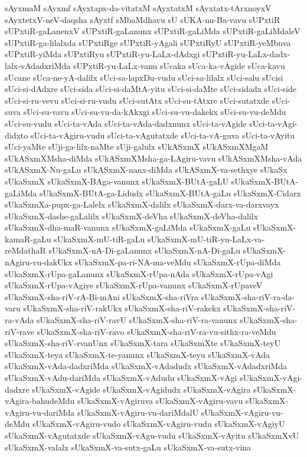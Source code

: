 {sAyxmaM
sAyxmf
sAyxtapx-da-vitatxM
sAyxtatxM
sAyxtatx-tArxnoyxV
sAyxtetxV-neV-daqsha
sAyxtf
sMbaMdhavu
sU
sUKA-nu-Ba-vavu
sUPxtiR
sUPxtiR-gaLanenxV
sUPxtiR-gaLanunx
sUPxtiR-gaLiMda
sUPxtiR-gaLiMdaleV
sUPxtiR-ga-lilalxda
sUPxtiRge
sUPxtiR-yAgali
sUPxtiRyU
sUPxtiR-yeMbuva
sUPxtiR-yiMda
sUPxtiRyu
sUPxtiR-yu-LaLx-dAdxgi
sUPxtiR-yu-LaLx-dadx-lalx-vAdadxriMda
sUPxtiR-yu-LaLx-vanu
sUcaka
sUca-ka-vAgide
sUca-kavu
sUcane
sUca-ne-yA-dalilx
sUci-sa-lapxDu-vudu
sUci-sa-lilalx
sUci-salu
sUcisi
sUci-si-dAdxre
sUci-sida
sUci-si-daMtA-yitu
sUci-si-daMte
sUci-sidadx
sUci-side
sUci-si-ru-vevu
sUci-si-ru-vudu
sUci-sutAtx
sUci-su-tAtxre
sUci-sutatxde
sUci-suva
sUci-su-vavu
sUci-su-vu-da-kAkxgi
sUci-su-vu-dakekx
sUci-su-vu-deMdu
sUci-su-vudu
sUci-ta-vAda
sUci-ta-vAda-dadxnunx
sUci-ta-vAgide
sUci-ta-vAgi-didxto
sUci-ta-vAgiru-vudu
sUci-ta-vAgutatxde
sUci-ta-vA-guva
sUci-ta-vAyitu
sUci-yaMte
sUji-ga-lilx-naMte
sUji-galulx
sUkASxmX
sUkASxmXMgaM
sUkASxmXMsha-diMda
sUkASxmXMsha-ga-LAgiru-vavu
sUkASxmXMsha-vAda
sUkASxmX-Nu-gaLu
sUkASxmX-nanx-diMda
sUkASxmX-va-sethxye
sUkaSx
sUkaSxmX
sUkaSxmX-BAga-vanunx
sUkaSxmX-BUtA-gaLU
sUkaSxmX-BUtA-gaLiMda
sUkaSxmX-BUtA-ga-Lidudx
sUkaSxmX-BUtA-gaLu
sUkaSxmX-Cidarx
sUkaSxmXa-pupx-ga-Lalelx
sUkaSxmX-dalilx
sUkaSxmX-darx-va-darxvayx
sUkaSxmX-dashe-gaLalilx
sUkaSxmX-deVha
sUkaSxmX-deVha-dalilx
sUkaSxmX-dha-maR-vanunx
sUkaSxmX-gaLiMda
sUkaSxmX-gaLu
sUkaSxmX-kamaR-gaLu
sUkaSxmX-mU-tiR-gaLu
sUkaSxmX-mU-tiR-yu-LaLx-va-reMdathaR
sUkaSxmX-nA-Di-gaLanunx
sUkaSxmX-nA-Di-gaLu
sUkaSxmX-nAgiru-vu-dakUkx
sUkaSxmX-pa-ri-NA-ma-veMdu
sUkaSxmX-rUpa-diMda
sUkaSxmX-rUpa-gaLanunx
sUkaSxmX-rUpa-nAda
sUkaSxmX-rUpa-vAgi
sUkaSxmX-rUpa-vAgiye
sUkaSxmX-rUpa-vanunx
sUkaSxmX-rUpaveV
sUkaSxmX-sha-riV-rA-Bi-mAni
sUkaSxmX-sha-riVra
sUkaSxmX-sha-riV-ra-da-varu
sUkaSxmX-sha-riV-rakUkx
sUkaSxmX-sha-riV-rakekx
sUkaSxmX-sha-riV-ra-vAda
sUkaSxmX-sha-riV-ravU
sUkaSxmX-sha-riV-ra-vanunx
sUkaSxmX-sha-riV-rave
sUkaSxmX-sha-riV-ravo
sUkaSxmX-sha-riV-ra-vu-sithx-ra-veMdu
sUkaSxmX-sha-riV-rvanUnx
sUkaSxmX-tara
sUkaSxmXte
sUkaSxmX-teyU
sUkaSxmX-teya
sUkaSxmX-te-yanunx
sUkaSxmX-teyu
sUkaSxmX-vAda
sUkaSxmX-vAda-dadxriMda
sUkaSxmX-vAdadudx
sUkaSxmX-vAdadxriMda
sUkaSxmX-vAdu-dariMda
sUkaSxmX-vAdudu
sUkaSxmX-vAgi
sUkaSxmX-vAgi-dadxre
sUkaSxmX-vAgide
sUkaSxmX-vAgidudx
sUkaSxmX-vAgira
sUkaSxmX-vAgira-bahudeMdu
sUkaSxmX-vAgiruva
sUkaSxmX-vAgiru-vavu
sUkaSxmX-vAgiru-vu-dariMda
sUkaSxmX-vAgiru-vu-dariMdalU
sUkaSxmX-vAgiru-vu-deMdu
sUkaSxmX-vAgiru-vudo
sUkaSxmX-vAgiru-vudu
sUkaSxmX-vAgiyU
sUkaSxmX-vAgutatxde
sUkaSxmX-vAgu-vudu
sUkaSxmX-vAyitu
sUkaSxmXvU
sUkaSxmX-valalx
sUkaSxmX-va-sutx-gaLu
sUkaSxmX-va-sutx-vina
}
